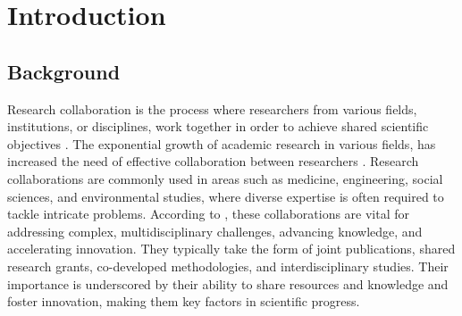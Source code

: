 \chapter{Introduction}\label{chap:intro}

\begin{comment}
This chapter presents the thesis' foundation such as: background, challenges, and goals of the study.
It begins with the Background (Sec.~\ref{sec:background}), which provides a research collaboration overview, its importance in advancing scientific discovery, the role of digital tools and finally the recommender systems in facilitating such collaborations.
The chapter then moves to the problem statement (Sec.~\ref{sec:problem-statement}), highlighting the limitations of traditional approaches and existing \gls{ai} methods in identifying potential research collaborators, such as their lack of interpretability, contextual understanding, and ability to generalize across diverse scenarios.
Sec.~\ref{sec:thesis-statement} defines the thesis statement, which outlines the proposed solution: a recommender system integrating knowledge graphs and large language models to deliver accurate, explainable, and context-aware recommendations.
The research gap (Sec.~\ref{sec:research-gap}) identifies shortcomings in current methods, emphasizing the unexplored potential of combining knowledge graphs with retrieval-augmented large language models to enhance precision and explainability.
The chapter also illustrates research questions (Sec.~\ref{sec:research-questions}) in order to guide the investigation and concludes with a thesis structure (Sec. \ref{sec:thesis-structure}), offering a roadmap for the subsequent chapters of the document.
\end{comment}

\section{Background}\label{sec:background}
Research collaboration is the process where researchers from various fields, institutions, or disciplines, work together in order to achieve shared scientific objectives \cite{KATZ19971}.
The exponential growth of academic research in various fields, has increased the need of effective collaboration between researchers \cite{Adams2012, Vermeulen2017}.
Research collaborations are commonly used in areas such as medicine, engineering, social sciences, and environmental studies, where diverse expertise is often required to tackle intricate problems.
According to \textcite{Mei2021}, these collaborations are vital for addressing complex, multidisciplinary challenges, advancing knowledge, and accelerating innovation.
They typically take the form of joint publications, shared research grants, co-developed methodologies, and interdisciplinary studies.
Their importance is underscored by their ability to share resources and knowledge and foster innovation, making them key factors in scientific progress.

